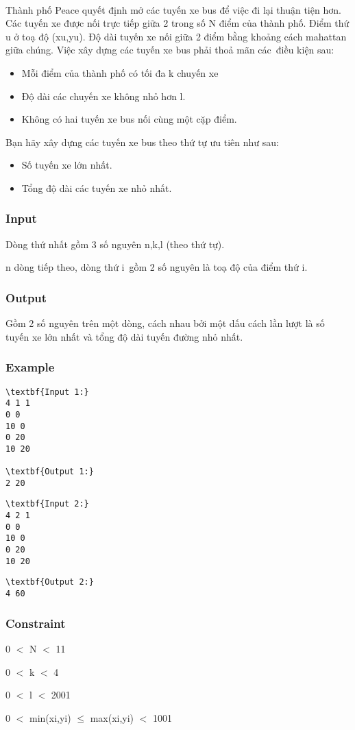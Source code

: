

 

Thành phố Peace quyết định mở các tuyến xe bus để việc đi lại thuận tiện hơn. Các tuyến xe được nối trực tiếp giữa 2 trong số N điểm của thành phố. Điểm thứ u ở toạ độ (xu,yu). Độ dài tuyến xe nối giữa 2 điểm bằng khoảng cách mahattan giữa chúng. Việc xây dựng các tuyến xe bus phải thoả mãn các điều kiện sau:
\begin{itemize}
	\item Mỗi điểm của thành phố có tối đa k chuyến xe
	\item Độ dài các chuyến xe không nhỏ hơn l.
	\item Không có hai tuyến xe bus nối cùng một cặp điểm.
\end{itemize}

Bạn hãy xây dựng các tuyến xe bus theo thứ tự ưu tiên như sau:
\begin{itemize}
	\item Số tuyến xe lớn nhất.
	\item Tổng độ dài các tuyến xe nhỏ nhất.
\end{itemize}

\subsubsection{Input}

Dòng thứ nhất gồm 3 số nguyên n,k,l (theo thứ tự).

n dòng tiếp theo, dòng thứ i gồm 2 số nguyên là toạ độ của điểm thứ i.

\subsubsection{Output}

Gồm 2 số nguyên trên một dòng, cách nhau bởi một dấu cách lần lượt là số tuyến xe lớn nhất và tổng độ dài tuyến đường nhỏ nhất.

\subsubsection{Example}
\begin{verbatim}
\textbf{Input 1:}
4 1 1
0 0
10 0
0 20
10 20

\textbf{Output 1:}
2 20\end{verbatim}
\begin{verbatim}
\textbf{Input 2:}
4 2 1
0 0
10 0
0 20
10 20\end{verbatim}
\begin{verbatim}
\textbf{Output 2:}
4 60\end{verbatim}

\subsubsection{Constraint}

0 $<$ N $<$ 11

0 $<$ k $<$ 4

0 $<$ l $<$ 2001

0 $<$ min(xi,yi)  $\le$  max(xi,yi) $<$ 1001
